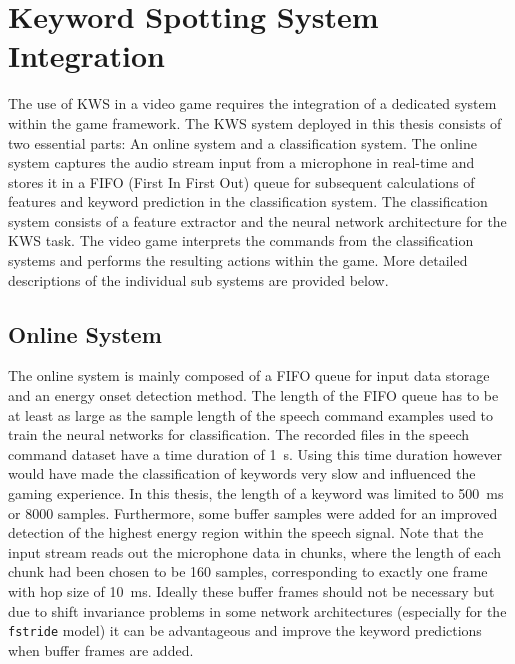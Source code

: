 
\section{Keyword Spotting System Integration}
The use of KWS in a video game requires the integration of a dedicated system within the game framework.
The KWS system deployed in this thesis consists of two essential parts: An online system and a classification system.
The online system captures the audio stream input from a microphone in real-time and stores it in a FIFO (First In First Out) queue for subsequent calculations of features and keyword prediction in the classification system.
The classification system consists of a feature extractor and the neural network architecture for the KWS task.
The video game interprets the commands from the classification systems and performs the resulting actions within the game.
More detailed descriptions of the individual sub systems are provided below.



\subsection{Online System}
The online system is mainly composed of a FIFO queue for input data storage and an energy onset detection method.
The length of the FIFO queue has to be at least as large as the sample length of the speech command examples used to train the neural networks for classification.
The recorded files in the speech command dataset have a time duration of \SI{1}{\second}. 
Using this time duration however would have made the classification of keywords very slow and influenced the gaming experience.
In this thesis, the length of a keyword was limited to \SI{500}{\milli\second} or 8000 samples.
Furthermore, some buffer samples were added for an improved detection of the highest energy region within the speech signal.
Note that the input stream reads out the microphone data in chunks, where the length of each chunk had been chosen to be 160 samples, corresponding to exactly one frame with hop size of \SI{10}{\milli\second}.
Ideally these buffer frames should not be necessary but due to shift invariance problems in some network architectures (especially for the \texttt{fstride} model) it can be advantageous and improve the keyword predictions when buffer frames are added.

